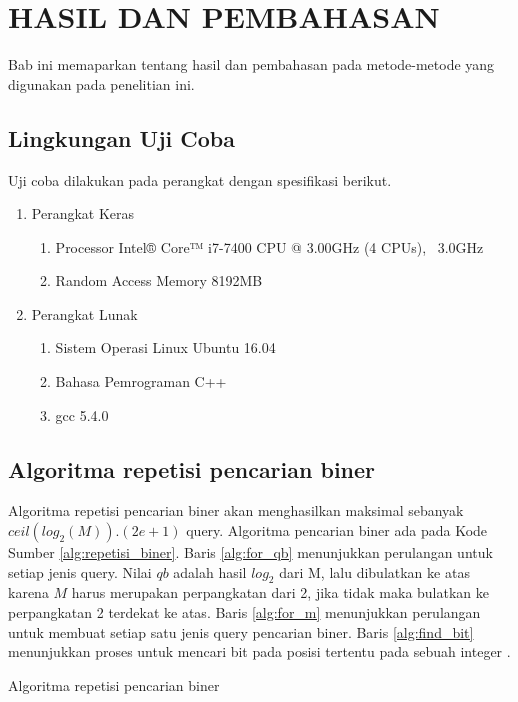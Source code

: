 \chapter{HASIL DAN PEMBAHASAN}

Bab ini memaparkan tentang hasil dan pembahasan pada metode-metode yang digunakan pada penelitian ini.

\section{Lingkungan Uji Coba}

Uji coba dilakukan pada perangkat dengan spesifikasi berikut.

\begin{enumerate}
  \item Perangkat Keras
  \begin{enumerate}
    \item Processor Intel® Core™ i7-7400 CPU @ 3.00GHz (4 CPUs), ~3.0GHz
    \item Random Access Memory 8192MB
  \end{enumerate}
  \item Perangkat Lunak
  \begin{enumerate}
    \item Sistem Operasi Linux Ubuntu 16.04
    \item Bahasa Pemrograman C++
    \item gcc 5.4.0
  \end{enumerate}
\end{enumerate}

\section{Algoritma repetisi pencarian biner}

Algoritma repetisi pencarian biner akan menghasilkan maksimal sebanyak $ceil(log_2(M)) . (2e + 1)$ query. Algoritma pencarian biner ada pada Kode Sumber \ref{alg:repetisi_biner}. Baris \ref{alg:for_qb} menunjukkan perulangan untuk setiap jenis query. Nilai $qb$ adalah hasil $log_2$ dari M, lalu dibulatkan ke atas karena $M$ harus merupakan perpangkatan dari 2, jika tidak maka bulatkan ke perpangkatan 2 terdekat ke atas. Baris \ref{alg:for_m} menunjukkan perulangan untuk membuat setiap satu jenis query pencarian biner. Baris \ref{alg:find_bit} menunjukkan proses untuk mencari bit pada posisi tertentu pada sebuah integer \cite{bithack}.

\begin{algorithm}[H]
\label{alg:repetisi_biner}
\caption{Algoritma repetisi pencarian biner}
\end{algorithm}

